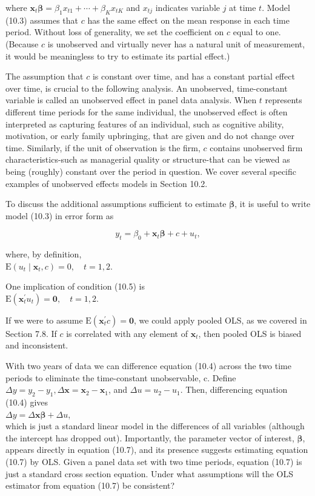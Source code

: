 \documentclass[10pt]{article}
\begin{document}
where $\mathbf{x}_{t} \boldsymbol{\beta}=\beta_{1} x_{t 1}+\cdots+\beta_{K} x_{t K}$ and $x_{t j}$ indicates variable $j$ at time $t$. Model (10.3) assumes that $c$ has the same effect on the mean response in each time period. Without loss of generality, we set the coefficient on $c$ equal to one. (Because $c$ is unobserved and virtually never has a natural unit of measurement, it would be meaningless to try to estimate its partial effect.)

The assumption that $c$ is constant over time, and has a constant partial effect over time, is crucial to the following analysis. An unobserved, time-constant variable is called an unobserved effect in panel data analysis. When $t$ represents different time periods for the same individual, the unobserved effect is often interpreted as capturing features of an individual, such as cognitive ability, motivation, or early family upbringing, that are given and do not change over time. Similarly, if the unit of observation is the firm, $c$ contains unobserved firm characteristics-such as managerial quality or structure-that can be viewed as being (roughly) constant over the period in question. We cover several specific examples of unobserved effects models in Section 10.2.

To discuss the additional assumptions sufficient to estimate $\boldsymbol{\beta}$, it is useful to write model (10.3) in error form as


\begin{equation*}
y_{t}=\beta_{0}+\mathbf{x}_{t} \boldsymbol{\beta}+c+u_{t}, \tag{10.4}
\end{equation*}


where, by definition,\\
$\mathrm{E}\left(u_{t} \mid \mathbf{x}_{t}, c\right)=0, \quad t=1,2$.

One implication of condition (10.5) is\\
$\mathrm{E}\left(\mathbf{x}_{t}^{\prime} u_{t}\right)=\mathbf{0}, \quad t=1,2$.

If we were to assume $\mathrm{E}\left(\mathbf{x}_{t}^{\prime} c\right)=\mathbf{0}$, we could apply pooled OLS, as we covered in Section 7.8. If $c$ is correlated with any element of $\mathbf{x}_{t}$, then pooled OLS is biased and inconsistent.

With two years of data we can difference equation (10.4) across the two time periods to eliminate the time-constant unobservable, c. Define $\Delta y=y_{2}-y_{1}, \Delta \mathbf{x}=\mathbf{x}_{2}-\mathbf{x}_{1}$, and $\Delta u=u_{2}-u_{1}$. Then, differencing equation (10.4) gives\\
$\Delta y=\Delta \mathbf{x} \boldsymbol{\beta}+\Delta u$,\\
which is just a standard linear model in the differences of all variables (although the intercept has dropped out). Importantly, the parameter vector of interest, $\boldsymbol{\beta}$, appears directly in equation (10.7), and its presence suggests estimating equation (10.7) by OLS. Given a panel data set with two time periods, equation (10.7) is just a standard cross section equation. Under what assumptions will the OLS estimator from equation (10.7) be consistent?
\end{document}
